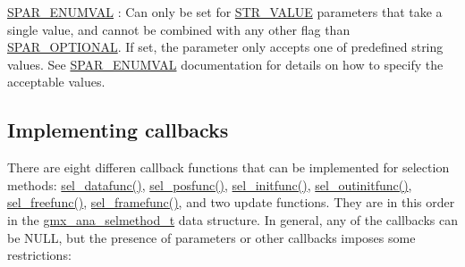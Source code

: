 \begin{DoxyItemize}
\item \hyperlink{share_2template_2gromacs_2selparam_8h_a9cab7952c47c82291754bb1b90db31e7}{\-S\-P\-A\-R\-\_\-\-E\-N\-U\-M\-V\-A\-L} \-: \-Can only be set for \hyperlink{share_2template_2gromacs_2selvalue_8h_a70b42b87d434580bf1493591857b8beca6f2f1fe9592d96990c9ac690c355bd08}{\-S\-T\-R\-\_\-\-V\-A\-L\-U\-E} parameters that take a single value, and cannot be combined with any other flag than \hyperlink{share_2template_2gromacs_2selparam_8h_a9829627bea1b9a81fe204f333a6519b6}{\-S\-P\-A\-R\-\_\-\-O\-P\-T\-I\-O\-N\-A\-L}. \-If set, the parameter only accepts one of predefined string values. \-See \hyperlink{share_2template_2gromacs_2selparam_8h_a9cab7952c47c82291754bb1b90db31e7}{\-S\-P\-A\-R\-\_\-\-E\-N\-U\-M\-V\-A\-L} documentation for details on how to specify the acceptable values.
\end{DoxyItemize}\hypertarget{selmethods_selmethods_callbacks}{}\subsection{\-Implementing callbacks}\label{selmethods_selmethods_callbacks}
\-There are eight differen callback functions that can be implemented for selection methods\-: \hyperlink{include_2selmethod_8h_a5acbf2d7bead71c4d96f9e69b267df56}{sel\-\_\-datafunc()}, \hyperlink{include_2selmethod_8h_a2b41f82c4d493740c63d148eff2129b8}{sel\-\_\-posfunc()}, \hyperlink{include_2selmethod_8h_a112e5ec6891c5963a59384cf41f0cc89}{sel\-\_\-initfunc()}, \hyperlink{include_2selmethod_8h_a682279959b047d5bf8a540b00196332b}{sel\-\_\-outinitfunc()}, \hyperlink{include_2selmethod_8h_a2e05a0b2274edfeab965c363f646735a}{sel\-\_\-freefunc()}, \hyperlink{include_2selmethod_8h_a62eee18354ffce940f10c7dd9ff1c34b}{sel\-\_\-framefunc()}, and two update functions. \-They are in this order in the {\ttfamily \hyperlink{structgmx__ana__selmethod__t}{gmx\-\_\-ana\-\_\-selmethod\-\_\-t}} data structure. \-In general, any of the callbacks can be \-N\-U\-L\-L, but the presence of parameters or other callbacks imposes some restrictions\-:
